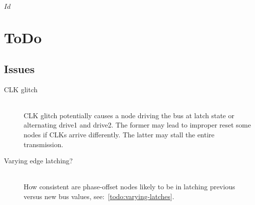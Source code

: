\svnInfo $Id$

\section{ToDo}
\label{sec:todo}
\subsection{Issues}
\begin{description}
	\item[CLK glitch] \hfil \\
	CLK glitch potentially causes a node driving the bus at {\sc latch state} or
	alternating {\sc drive1} and {\sc drive2}. The former may lead to improper
	reset some nodes if CLKs arrive differently. The latter may stall the entire
	transmission.

  \item[Varying edge latching?] \hfil \\
  How consistent are phase-offset nodes likely to be in latching previous
  versus new bus values, see:~\ref{todo:varying-latches}.
\end{description}
